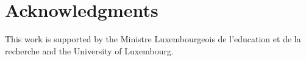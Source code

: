 \documentclass[conference,10pt,a4]{IEEEtran}
\begin{document}
\section*{Acknowledgments}
This work is supported by the Ministre Luxembourgeois de l'education et de la recherche and the University of Luxembourg. 



\end{document}
